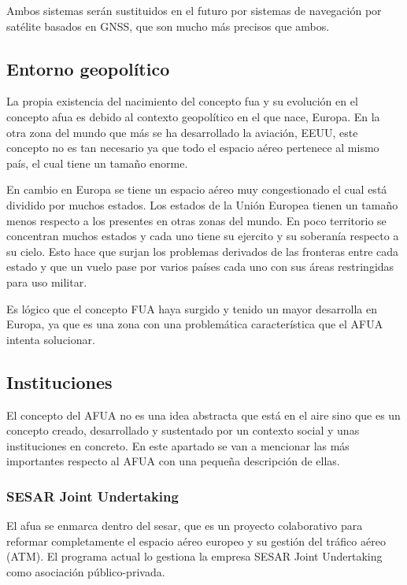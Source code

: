 Ambos sistemas serán sustituidos en el futuro por sistemas de navegación por satélite basados en GNSS, que son mucho más precisos que ambos.

\subsection{Entorno geopolítico}

La propia existencia del nacimiento del concepto \acrfull{fua} y su evolución en el concepto \acrfull{afua} es debido al contexto geopolítico en el que nace, Europa. En la otra zona del mundo que más se ha desarrollado la aviación, EEUU, este concepto no es tan necesario ya que todo el espacio aéreo pertenece al mismo país, el cual tiene un tamaño enorme. 

En cambio en Europa se tiene un espacio aéreo muy congestionado el cual está dividido por muchos estados. Los estados de la Unión Europea tienen un tamaño menos respecto a los presentes en otras zonas del mundo. En poco territorio se concentran muchos estados y cada uno tiene su ejercito y su soberanía respecto a su cielo. Esto hace que surjan los problemas derivados de las fronteras entre cada estado y que un vuelo pase por varios países cada uno con sus áreas restringidas para uso militar.

Es lógico que el concepto FUA haya surgido y tenido un mayor desarrolla en Europa, ya que es una zona con una problemática característica que el AFUA intenta solucionar.

\subsection{Instituciones}

El concepto del AFUA no es una idea abstracta que está en el aire sino que es un concepto creado, desarrollado y sustentado por un contexto social y unas instituciones en concreto. En este apartado se van a mencionar las más importantes respecto al AFUA con una pequeña descripción de ellas.

\subsubsection{SESAR Joint Undertaking}

El \acrfull{afua} se enmarca dentro del \acrfull{sesar}, que es un proyecto colaborativo para reformar completamente el espacio aéreo europeo y su gestión del tráfico aéreo (ATM). El programa actual lo gestiona la empresa SESAR Joint Undertaking como asociación público-privada.

